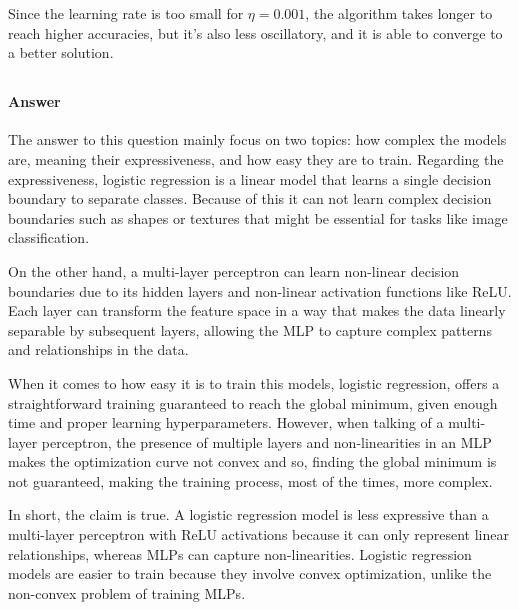 \documentclass{article}
\begin{document}
Since the learning rate is too small for $\eta = 0.001$, the algorithm takes longer to reach higher accuracies, but it's also 
less oscillatory, and it is able to converge to a better solution.

\subsection{}

\subsubsection{}

\paragraph{Answer}
The answer to this question mainly focus on two topics: how complex the models are, meaning their expressiveness, and how easy they are to train. 
Regarding the expressiveness, logistic regression is a linear model that learns a single decision boundary to separate classes. Because of this
it can not learn complex decision boundaries such as shapes or textures that might be essential for tasks like image classification.

On the other hand, a multi-layer perceptron can learn non-linear decision boundaries due to its hidden layers and non-linear activation functions like ReLU. 
Each layer can transform the feature space in a way that makes the data linearly separable by subsequent layers, allowing the MLP to capture 
complex patterns and relationships in the data.

When it comes to how easy it is to train this models, logistic regression, offers a straightforward training guaranteed to reach the global minimum, 
given enough time and proper learning hyperparameters. However, when talking of a multi-layer perceptron, the presence of multiple layers and non-linearities 
in an MLP makes the optimization curve not convex and so, finding the global minimum is not guaranteed, making the training process, most of the times, more complex.

In short, the claim is true. A logistic regression model is less expressive than a multi-layer perceptron with ReLU activations because it can only 
represent linear relationships, whereas MLPs can capture non-linearities. Logistic regression models are easier to train because they involve 
convex optimization, unlike the non-convex problem of training MLPs.
\end{document}
